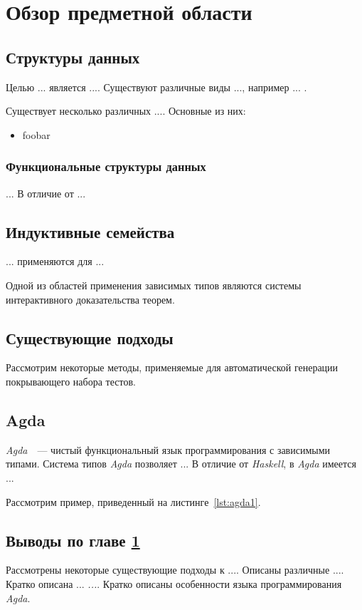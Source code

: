 \chapter{Обзор предметной области}
\label{chapter1}

\section{Структуры данных}
Целью ... является .... Существуют различные виды ..., например ... 
. 

Существует несколько различных .... Основные из них:
\begin{itemize}
 \item foobar
\end{itemize}

\subsection{Функциональные структуры данных}
...
В отличие от ...

\section{Индуктивные семейства}

... применяются для ... 

Одной из областей применения зависимых типов являются системы интерактивного
доказательства теорем.

\section{Существующие подходы}
Рассмотрим некоторые методы, применяемые для автоматической генерации покрывающего набора тестов.

\section{Agda}
\textit{Agda}~\cite{AgdaLang}~---  чистый функциональный язык программирования с зависимыми типами.
Система типов \textit{Agda} позволяет ... 
В отличие от \textit{Haskell}, в \textit{Agda} имеется ... 

Рассмотрим пример, приведенный на листинге~\ref{lst:agda1}.



\section{Выводы по главе \ref{chapter1}}
Рассмотрены некоторые существующие подходы к ....
Описаны различные ....
Кратко описана ... \textit{...}.
Кратко описаны особенности языка программирования \textit{Agda}.


